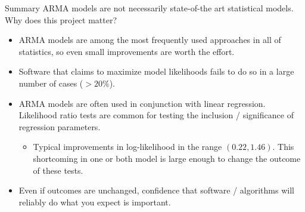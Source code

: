 \documentclass[aspectratio=169]{beamer}\usepackage[]{graphicx}\usepackage[]{xcolor}
\begin{document}
\begin{frame}{Summary}
ARMA models are not necessarily state-of-the art statistical models. Why does this project matter?
  \begin{itemize}
    \item ARMA models are among the most frequently used approaches in all of statistics, so even small improvements are worth the effort.\pause
    \item Software that claims to maximize model likelihoods fails to do so in a large number of cases ($>20\%$).\pause
    \item ARMA models are often used in conjunction with linear regression. Likelihood ratio tests are common for testing the inclusion / significance of regression parameters.\pause
    \begin{itemize}
      \item Typical improvements in log-likelihood in the range $(0.22, 1.46)$. This shortcoming in one or both model is large enough to change the outcome of these tests.\pause
    \end{itemize}
    \item Even if outcomes are unchanged, confidence that software / algorithms will reliably do what you expect is important. 
  \end{itemize}
\end{frame}
\end{document}

